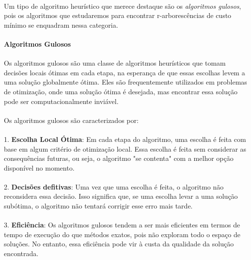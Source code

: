\documentclass[12pt,a4paper]{article}
\begin{document}
\paragraph{}
Um tipo de algoritmo heurístico que merece destaque são os \emph{algoritmos gulosos}, pois os algoritmos que estudaremos para encontrar r-arborescências de custo mínimo se enquadram nessa categoria.

\paragraph{Algoritmos Gulosos}
\paragraph{}
Os algoritmos gulosos são uma classe de algoritmos heurísticos que tomam decisões locais ótimas em cada etapa, na esperança de que essas escolhas levem a uma solução globalmente ótima. Eles são frequentemente utilizados em problemas de otimização, onde uma solução ótima é desejada, mas encontrar essa solução pode ser computacionalmente inviável.

\paragraph{}
Os algoritmos gulosos são caracterizados por:
\paragraph{}

1. \textbf{Escolha Local Ótima}: Em cada etapa do algoritmo, uma escolha é feita com base em algum critério de otimização local. Essa escolha é feita sem considerar as consequências futuras, ou seja, o algoritmo "se contenta" com a melhor opção disponível no momento.

\paragraph{}
2. \textbf{Decisões defitivas}: Uma vez que uma escolha é feita, o algoritmo não reconsidera essa decisão. Isso significa que, se uma escolha levar a uma solução subótima, o algoritmo não tentará corrigir esse erro mais tarde.

\paragraph{}
3. \textbf{Eficiência}: Os algoritmos gulosos tendem a ser mais eficientes em termos de tempo de execução do que métodos exatos, pois não exploram todo o espaço de soluções. No entanto, essa eficiência pode vir à custa da qualidade da solução encontrada.
\end{document}

